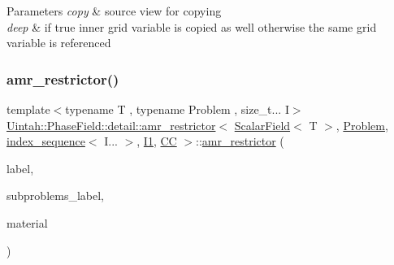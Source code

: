 \begin{DoxyParams}{Parameters}
{\em copy} & source view for copying \\
\hline
{\em deep} & if true inner grid variable is copied as well otherwise the same grid variable is referenced \\
\hline
\end{DoxyParams}
\mbox{\label{classUintah_1_1PhaseField_1_1detail_1_1amr__restrictor_3_01ScalarField_3_01T_01_4_00_01Problem_0778720acc9a55f696b8537356a4dbcae_a880d7f565151be8edc8b5b549e0a50ca}} 
\subsubsection{\texorpdfstring{amr\+\_\+restrictor()}{amr\_restrictor()}\hspace{0.1cm}{\footnotesize\ttfamily [2/4]}}
{\footnotesize\ttfamily template$<$typename T , typename Problem , size\+\_\+t... I$>$ \\
\hyperlink{classUintah_1_1PhaseField_1_1detail_1_1amr__restrictor}{Uintah\+::\+Phase\+Field\+::detail\+::amr\+\_\+restrictor}$<$ \hyperlink{structUintah_1_1PhaseField_1_1ScalarField}{Scalar\+Field}$<$ T $>$, \hyperlink{classUintah_1_1PhaseField_1_1Problem}{Problem}, \hyperlink{namespaceUintah_1_1PhaseField_a237de804d99512e50613aff7c94a9461}{index\+\_\+sequence}$<$ I... $>$, \hyperlink{namespaceUintah_1_1PhaseField_a547ce3002aa97fbd3ef3192a6eec8406a66f19efe774b0d2b6e5844eb2d83d305}{I1}, \hyperlink{namespaceUintah_1_1PhaseField_a33d355affda78a83f45755ba8388cedda22303704507d024d1d6508ed9859a85a}{CC} $>$\+::\hyperlink{classUintah_1_1PhaseField_1_1detail_1_1amr__restrictor}{amr\+\_\+restrictor} (\begin{DoxyParamCaption}\item[{const Var\+Label $\ast$}]{label,  }\item[{const Var\+Label $\ast$}]{subproblems\+\_\+label,  }\item[{int}]{material }\end{DoxyParamCaption})\hspace{0.3cm}{\ttfamily [inline]}}




